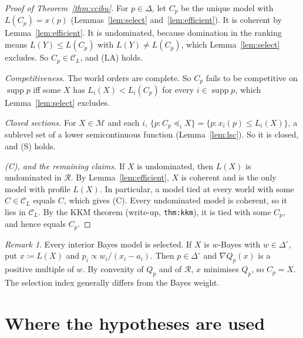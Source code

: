 \documentclass[11pt]{article}
\theoremstyle{remark}
\newtheorem{remark}[theorem]{Remark}
\newcommand{\Di}{\Delta^{\circ}}
\newcommand{\M}{\mathcal M}
\newcommand{\C}{\mathcal C}
\newcommand{\Rr}{\mathcal R}
\newcommand{\supp}{\operatorname{supp}}
\begin{document}
\begin{proof}[Proof of Theorem~\ref{thm:ccibu}]
For $p\in\Delta$, let $C_p$ be the unique model with $L(C_p)=x(p)$ (Lemmas~\ref{lem:select} and~\ref{lem:efficient}). It is coherent by Lemma~\ref{lem:efficient}. It is undominated, because domination in the ranking means $L(Y)\le L(C_p)$ with $L(Y)\ne L(C_p)$, which Lemma~\ref{lem:select} excludes. So $C_p\in\C_L$, and (LA) holds.

\emph{Competitiveness.} The world orders are complete. So $C_p$ fails to be competitive on $\supp p$ iff some $X$ has $L_i(X)<L_i(C_p)$ for every $i\in\supp p$, which Lemma~\ref{lem:select} excludes.

\emph{Closed sections.} For $X\in\M$ and each $i$, $\{p:C_p\preceq_iX\}=\{p:x_i(p)\le L_i(X)\}$, a sublevel set of a lower semicontinuous function (Lemma~\ref{lem:lsc}). So it is closed, and (S) holds.

\emph{(C), and the remaining claims.} If $X$ is undominated, then $L(X)$ is undominated in $\Rr$. By Lemma~\ref{lem:efficient}, $X$ is coherent and is the only model with profile $L(X)$. In particular, a model tied at every world with some $C\in\C_L$ equals $C$, which gives (C). Every undominated model is coherent, so it lies in $\C_L$. By the KKM theorem (write-up, \texttt{thm:kkm}), it is tied with some $C_p$, and hence equals $C_p$.
\end{proof}

\begin{remark}\label{rem:reindex}
Every interior Bayes model is selected. If $X$ is $w$-Bayes with $w\in\Di$, put $x\coloneqq L(X)$ and $p_i\propto w_i/(x_i-a_i)$. Then $p\in\Di$ and $\nabla Q_p(x)$ is a positive multiple of $w$. By convexity of $Q_p$ and of $\Rr$, $x$ minimises $Q_p$, so $C_p=X$. The selection index generally differs from the Bayes weight.
\end{remark}

\section{Where the hypotheses are used}\label{sec:uses}
\end{document}
